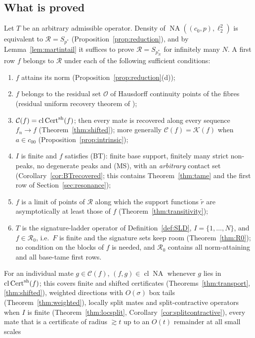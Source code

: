 \documentclass[10pt]{amsart}
\theoremstyle{definition}
\theoremstyle{remark}
\newcommand{\NA}{\operatorname{NA}}
\newcommand{\Cset}{\mathcal C}
\newcommand{\Cert}{\operatorname{Cert}}
\newcommand{\cl}{\operatorname{cl}}
\newcommand{\Rec}{\mathcal R}
\begin{document}
\subsection{What is proved}
Let $T$ be an arbitrary admissible operator.  Density of
$\NA((c_0,p),\ell_2^2)$ is equivalent to $\Rec=S_{p^*}$
(Proposition~\ref{prop:reduction}), and by Lemma~\ref{lem:martintail} it
suffices to prove $\Rec=S_{p_N^*}$ for infinitely many $N$.  A first row
$f$ belongs to $\Rec$ under each of the following sufficient conditions:
\begin{enumerate}
\item[(S1)] $f$ attains its norm (Proposition~\ref{prop:reduction}(d));
\item[(S2)] $f$ belongs to the residual set $\mathcal O$ of Hausdorff continuity
points of the fibres (residual uniform recovery theorem of \cite{PrA});
\item[(S3)] $\Cset(f)=\cl\Cert^{\rm sh}(f)$; then every mate is recovered
along every sequence $f_n\to f$ (Theorem~\ref{thm:shifted}); more generally
$\Cset(f)=\mathcal K(f)$ when $a\in c_{00}$ (Proposition~\ref{prop:intrinsic});
\item[(S4)] $I$ is finite and $f$ satisfies \textup{(BT)}: finite base support,
finitely many strict non-peaks, no degenerate peaks and \textup{(MS)}, with
an \emph{arbitrary} contact set (Corollary~\ref{cor:BTrecovered}; this
contains Theorem~\ref{thm:tame} and the first row of
Section~\ref{sec:resonance});
\item[(S5)] $f$ is a limit of points of $\Rec$ along which the support
functions $\tilde r$ are asymptotically at least those of $f$
(Theorem~\ref{thm:transitivity});
\item[(S6)] $T$ is the signature-ladder operator of
Definition~\ref{def:SLD}, $I=\{1,\dots,N\}$, and $f\in\mathcal R_0$, i.e.\
$F$ is finite and the signature sets keep room (Theorem~\ref{thm:R0}); no
condition on the blocks of $f$ is needed, and $\mathcal R_0$ contains all
norm-attaining and all base-tame first rows.
\end{enumerate}
For an individual mate $g\in\Cset(f)$, $(f,g)\in\cl\NA$ whenever $g$ lies
in $\cl\Cert^{\rm sh}(f)$; this covers finite and shifted certificates
(Theorems~\ref{thm:transport}, \ref{thm:shifted}), weighted directions with
$O(\sigma)$ box tails (Theorem~\ref{thm:weighted}), locally split mates and
split-contractive operators when $I$ is finite (Theorem~\ref{thm:locsplit},
Corollary~\ref{cor:splitcontractive}), every mate that is a certificate of
radius $\gtrsim t$ up to an $O(t)$ remainder at all small scales
\end{document}
